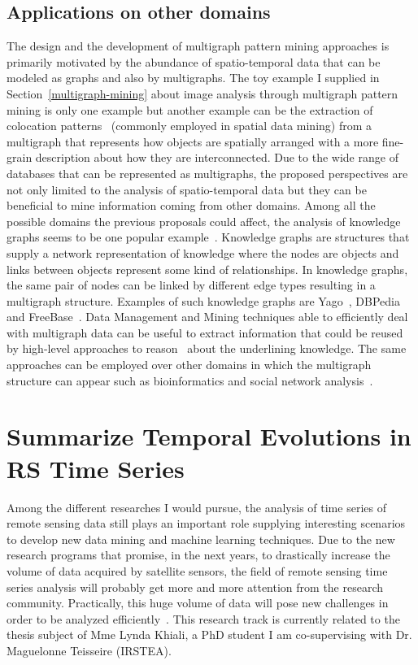 \subsection{Applications on other domains}
The design and the development of multigraph pattern mining approaches is primarily motivated by the abundance of spatio-temporal data that can be modeled as graphs and also by multigraphs. The toy example I supplied in Section~\ref{multigraph-mining} about image analysis through multigraph pattern mining is only one example but another example can be the extraction of colocation patterns~\cite{YooB12} (commonly employed in spatial data mining) from a multigraph that represents how objects are spatially arranged with a more fine-grain description about how they are interconnected. 
Due to the wide range of databases that can be represented as multigraphs, the proposed perspectives are not only limited to the analysis of spatio-temporal data but they can be beneficial to mine information coming from other domains.
Among all the possible domains the previous proposals could affect, the analysis of knowledge graphs seems to be one popular example~\cite{Nickel0TG16,YahyaBBWW16,LinLSLZ15}. Knowledge graphs are structures that supply a network representation of knowledge where the nodes are objects and links between objects represent some kind of relationships. In knowledge graphs, the same pair of nodes can be linked by different edge types resulting in a multigraph structure. Examples of such knowledge graphs are Yago~\cite{MahdisoltaniBS15}, DBPedia~\cite{LehmannIJJKMHMK15} and FreeBase~\cite{BollackerCT07}. 
Data Management and Mining techniques able to efficiently deal with multigraph data can be useful to extract information that could be reused by high-level approaches to reason~\cite{FreitasSCB15} about the underlining knowledge.
The same approaches can be employed over other domains in which the multigraph structure can appear such as bioinformatics and social network analysis~\cite{BodenGHS12,BonchiGGU14}.


\section{Summarize Temporal Evolutions in RS Time Series}
Among the different researches I would pursue, the analysis of time series of remote sensing data still plays an important role supplying interesting scenarios to develop new data mining and machine learning techniques. 
Due to the new research programs that promise, in the next years, to drastically increase the volume of data acquired by satellite sensors, the field of remote sensing time series analysis will probably get more and more attention from the research community. Practically, this huge volume of data will pose new challenges in order to be analyzed efficiently~\cite{MaFGCS2015,MaWLR15}.
This research track is currently related to the thesis subject of Mme Lynda Khiali, a PhD student I am co-supervising with Dr. Maguelonne Teisseire (IRSTEA).




